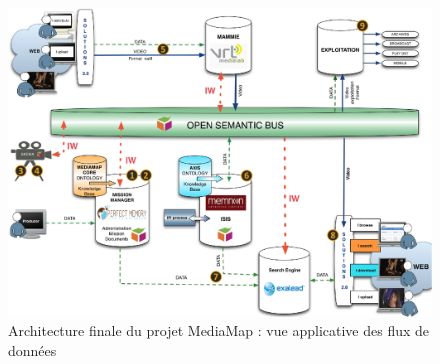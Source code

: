 \begin{figure}[ht!]
\centering
\includegraphics[width=1\textwidth]{./images/Architecture-apps-v1.png}
\caption{Architecture finale du projet MediaMap : vue applicative des flux de données}
\label{img:arch-apps}
\end{figure}


